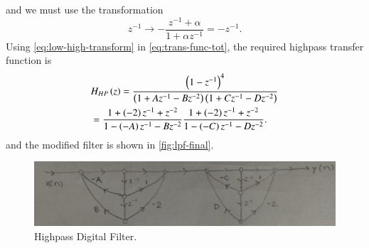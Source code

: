 \documentclass[journal,12pt,twocolumn]{IEEEtran}
\begin{document}
\begin{enumerate}[label=\theenumi.]
\begin{equation}
        \label{eq:alpha}
    \end{equation}
    and we must use the transformation
    \begin{equation}
        z^{-1} \rightarrow -\frac{z^{-1}+\alpha}{1+\alpha{}z^{-1}} = -z^{-1}.
        \label{eq:low-high-transform}
    \end{equation}
    Using \eqref{eq:low-high-transform} in \eqref{eq:trans-func-tot}, the 
    required highpass transfer function is
    \begin{align}
        &H_{HP}\left(z\right) = \frac{\left(1-z^{-1}\right)^4}{\left(1+Az^{-1}-Bz^{-2}\right)\left(1+Cz^{-1}-Dz^{-2}\right)} \\
        &= \frac{1+\left(-2\right)z^{-1}+z^{-2}}{1-\left(-A\right)z^{-1}-Bz^{-2}}\frac{1+\left(-2\right)z^{-1}+z^{-2}}{1-\left(-C\right)z^{-1}-Dz^{-2}}.
        \label{eq:highpass-transform}
    \end{align}
    and the modified filter is shown in \autoref{fig:lpf-final}.

    \begin{figure}[!ht]
        \centering
        \includegraphics[width=\columnwidth]{figs/lpf-final.jpg}
        \caption{Highpass Digital Filter.}
        \label{fig:lpf-final}
    \end{figure}


\end{enumerate}
\end{document}

